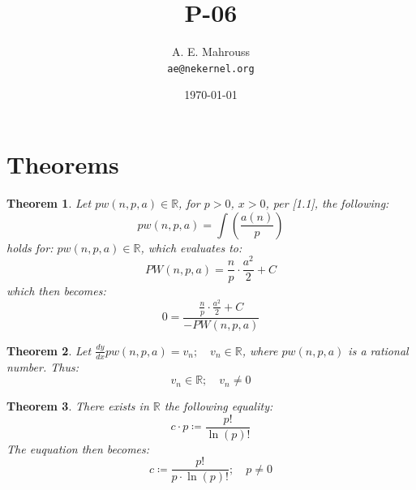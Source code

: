 \documentclass[11pt, a4paper]{article}
\title{P-06}
\author{A. E. Mahrouss\\\texttt{ae@nekernel.org}}
\date{\today}
\theoremstyle{plain}
\newtheorem{theorem}{Theorem}[section]
\theoremstyle{definition}
\theoremstyle{remark}
\begin{document}
\twocolumn[{%
  \maketitle
  \vspace{-0.5em}
  \vspace{0.8em}
  \rule{\linewidth}{0.4pt}
  \vspace{1em}
}]

\maketitle

\section{Theorems}

\begin{theorem}
  Let $pw(n, p, a) \in \mathbb{R}$, for $p > 0$, $x > 0$, per [1.1], the following:
  \begin{equation}
    pw(n, p, a) = \int (\frac{a(n)}{p})
  \end{equation}
  holds for: $pw(n, p, a) \in \mathbb{R}$, which evaluates to:
  \begin{equation}
    PW(n, p, a) = \frac{n}{p}\cdot \frac{a^2}{2}+C
  \end{equation}
  which then becomes:
  \begin{equation}
    0 = \frac{\frac{n}{p}\cdot \frac{a^2}{2}+C}{-PW(n, p, a)}
  \end{equation}
\end{theorem}

\begin{theorem}
  Let $\frac{dy}{dx}pw(n, p, a) = v_{n}; \quad v_{n} \in \mathbb{R}$, where $ pw(n, p, a) $ is a rational number. Thus:
  \begin{equation}
    v_{n} \in \mathbb{R}; \quad v_{n}\neq 0
  \end{equation}
\end{theorem}

\begin{theorem}
  There exists in $\mathbb{R}$ the following equality:
  \begin{equation}
    c \cdot p \coloneq \frac{p!}{\ln \left(p\right)!}
  \end{equation}
  The euquation then becomes:
  \begin{equation}
    c \coloneq \frac{p!}{p \cdot \ln \left(p\right)!}; \quad p \neq 0
  \end{equation}
\end{theorem}
\end{document}
